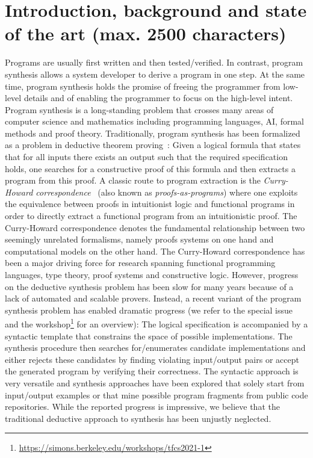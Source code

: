 \documentclass[a4paper,12pt]{article}
\begin{document}
\section{Introduction, background and state of the art (max. 2500 characters)}
Programs are usually first written and then tested/verified.
In contrast, program synthesis allows a system developer to derive a program in one step.
At the same time, program synthesis holds the promise of freeing the programmer from low-level details and of enabling the programmer to focus on the high-level intent.
Program synthesis is a long-standing problem that crosses many areas of computer science and mathematics including programming languages, AI, formal methods and proof theory.
Traditionally, program synthesis has been formalized as a problem in deductive theorem proving~\cite{conf/ijcai/MannaW79}:
Given a logical formula that states that for all inputs there exists an output such that the required specification holds, one searches for a constructive proof of this formula and then extracts a program from this proof.
A classic route to program extraction is the \emph{Curry-Howard correspondence}~\cite{?} (also known as \emph{proofs-as-programs}) where one exploits the equivalence between proofs in intuitionist logic and functional programs in order to directly extract a functional program from an intuitionistic proof.
The Curry-Howard correspondence denotes the fundamental relationship between two seemingly unrelated formalisms, namely proofs systems on one hand and computational models on the other hand.
The Curry-Howard correspondence has been a major driving force for research spanning functional programming languages, type theory, proof systems and constructive logic.
However, progress on the deductive synthesis problem has been slow for many years because of a lack of automated and scalable provers.
Instead, a recent variant of the program synthesis problem has enabled dramatic progress (we refer to the special issue~\cite{fisman2022special} and the workshop\footnote{\url{https://simons.berkeley.edu/workshops/tfcs2021-1}} for an overview):
The logical specification is accompanied by a syntactic template that constrains the space of possible implementations.
The synthesis procedure then searches for/enumerates candidate implementations and either rejects these candidates by finding violating input/output pairs or accept the generated program by verifying their correctness.
The syntactic approach is very versatile and synthesis approaches have been explored that solely start from input/output examples or that mine possible program fragments from public code repositories.
While the reported progress is impressive, we believe that the traditional deductive approach to synthesis has been unjustly neglected.
\end{document}
